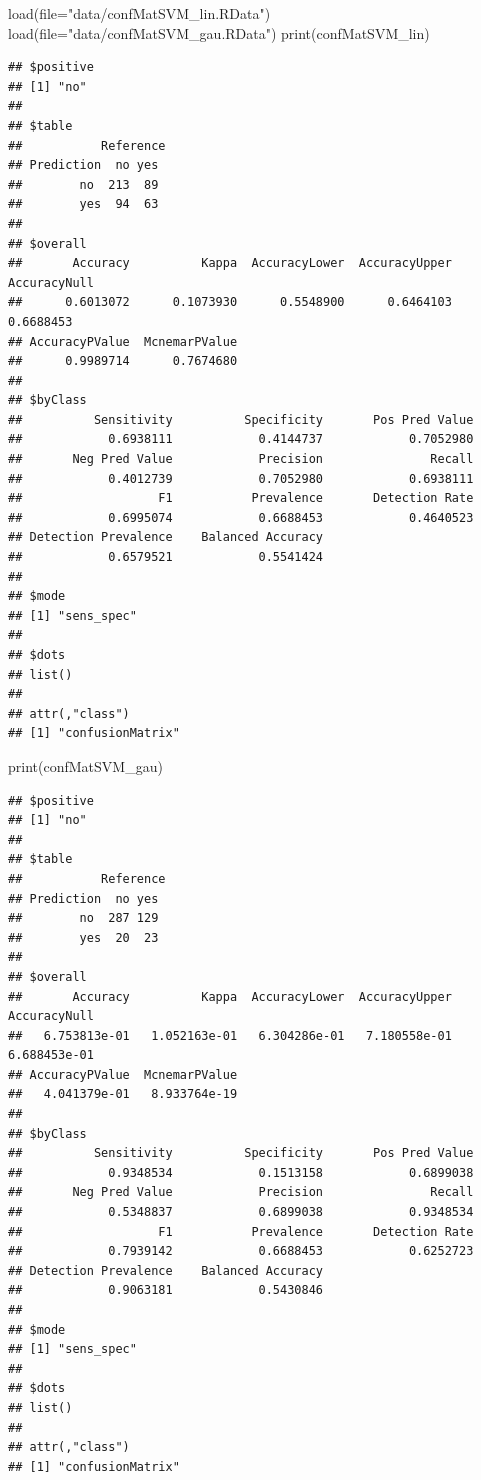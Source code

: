 \documentclass[
  12pt,
]{article}
\newenvironment{Shaded}{\begin{snugshade}}{\end{snugshade}}
\newcommand{\AttributeTok}[1]{\textcolor[rgb]{0.77,0.63,0.00}{#1}}
\newcommand{\FunctionTok}[1]{\textcolor[rgb]{0.00,0.00,0.00}{#1}}
\newcommand{\NormalTok}[1]{#1}
\newcommand{\StringTok}[1]{\textcolor[rgb]{0.31,0.60,0.02}{#1}}
\begin{document}
\begin{Shaded}
\begin{Highlighting}[]
\FunctionTok{load}\NormalTok{(}\AttributeTok{file=}\StringTok{"data/confMatSVM\_lin.RData"}\NormalTok{)}
\FunctionTok{load}\NormalTok{(}\AttributeTok{file=}\StringTok{"data/confMatSVM\_gau.RData"}\NormalTok{)}
\FunctionTok{print}\NormalTok{(confMatSVM\_lin)}
\end{Highlighting}
\end{Shaded}

\begin{verbatim}
## $positive
## [1] "no"
## 
## $table
##           Reference
## Prediction  no yes
##        no  213  89
##        yes  94  63
## 
## $overall
##       Accuracy          Kappa  AccuracyLower  AccuracyUpper   AccuracyNull 
##      0.6013072      0.1073930      0.5548900      0.6464103      0.6688453 
## AccuracyPValue  McnemarPValue 
##      0.9989714      0.7674680 
## 
## $byClass
##          Sensitivity          Specificity       Pos Pred Value 
##            0.6938111            0.4144737            0.7052980 
##       Neg Pred Value            Precision               Recall 
##            0.4012739            0.7052980            0.6938111 
##                   F1           Prevalence       Detection Rate 
##            0.6995074            0.6688453            0.4640523 
## Detection Prevalence    Balanced Accuracy 
##            0.6579521            0.5541424 
## 
## $mode
## [1] "sens_spec"
## 
## $dots
## list()
## 
## attr(,"class")
## [1] "confusionMatrix"
\end{verbatim}

\begin{Shaded}
\begin{Highlighting}[]
\FunctionTok{print}\NormalTok{(confMatSVM\_gau)}
\end{Highlighting}
\end{Shaded}

\begin{verbatim}
## $positive
## [1] "no"
## 
## $table
##           Reference
## Prediction  no yes
##        no  287 129
##        yes  20  23
## 
## $overall
##       Accuracy          Kappa  AccuracyLower  AccuracyUpper   AccuracyNull 
##   6.753813e-01   1.052163e-01   6.304286e-01   7.180558e-01   6.688453e-01 
## AccuracyPValue  McnemarPValue 
##   4.041379e-01   8.933764e-19 
## 
## $byClass
##          Sensitivity          Specificity       Pos Pred Value 
##            0.9348534            0.1513158            0.6899038 
##       Neg Pred Value            Precision               Recall 
##            0.5348837            0.6899038            0.9348534 
##                   F1           Prevalence       Detection Rate 
##            0.7939142            0.6688453            0.6252723 
## Detection Prevalence    Balanced Accuracy 
##            0.9063181            0.5430846 
## 
## $mode
## [1] "sens_spec"
## 
## $dots
## list()
## 
## attr(,"class")
## [1] "confusionMatrix"
\end{verbatim}
\end{document}
